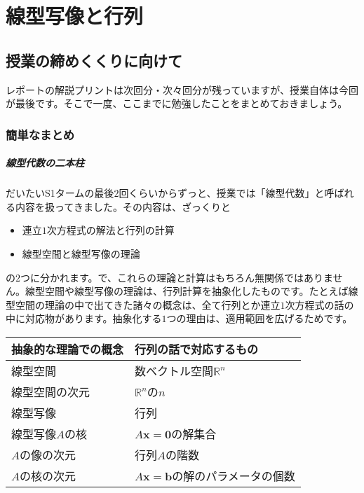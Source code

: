 \chapter{線型写像と行列}

\section{授業の締めくくりに向けて}

レポートの解説プリントは次回分・次々回分が残っていますが、授業自体は今回が最後です。そこで一度、ここまでに勉強したことをまとめておきましょう。

\subsection{簡単なまとめ}

\paragraph{線型代数の二本柱}

だいたいS1タームの最後$2$回くらいからずっと、授業では「線型代数」と呼ばれる内容を扱ってきました。その内容は、ざっくりと
\begin{itemize}
\item 連立$1$次方程式の解法と行列の計算
\item 線型空間と線型写像の理論
\end{itemize}
の$2$つに分かれます。で、これらの理論と計算はもちろん無関係ではありません。線型空間や線型写像の理論は、行列計算を抽象化したものです。たとえば線型空間の理論の中で出てきた諸々の概念は、全て行列とか連立$1$次方程式の話の中に対応物があります。抽象化する$1$つの理由は、適用範囲を広げるためです。
\begin{table}[h!tbp]
\centering
\begin{tabular}{ll} \hline
\textbf{抽象的な理論での概念} & \textbf{行列の話で対応するもの} \\ \hline
線型空間 & 数ベクトル空間$\mathbb{R}^n$ \\
線型空間の次元 & $\mathbb{R}^n$の$n$ \\
線型写像 & 行列 \\
線型写像$A$の核 & $A\bm{x} = \bm{0}$の解集合 \\
$A$の像の次元 & 行列$A$の階数 \\
$A$の核の次元 & $A\bm{x} = \bm{b}$の解のパラメータの個数 \\ \hline
\end{tabular}
\end{table}

